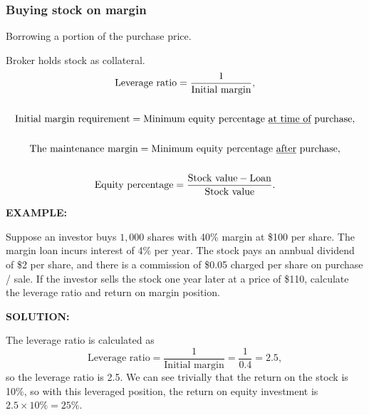 \documentclass[../notes_compiled.tex]{subfiles}
\begin{document}
\subsubsection{Buying stock on margin}
\begin{itemize}
\item Borrowing a portion of the purchase price.
\item Broker holds stock as collateral.
\begin{gather}
\text{Leverage ratio} = \frac{1}{\text{Initial margin}}, \\ \nonumber \\
\text{Initial margin requirement} = \text{Minimum equity percentage \underline{at time of} purchase}, \\ \nonumber \\
\text{The maintenance margin} = \text{Minimum equity percentage \underline{after} purchase}, \\ \nonumber \\
\text{Equity percentage} = \frac{\text{Stock value}-\text{Loan}}{\text{Stock value}}.
\end{gather}

{\color{RedViolet}
\item[] \textbf{EXAMPLE:} 
\item[] Suppose an investor buys $1,000$ shares with 40\% margin at \$100 per share. The margin loan incurs interest of 4\% per year. The stock pays an annbual dividend of \$2 per share, and there is a commission of \$0.05 charged per share on purchase / sale. If the investor sells the stock one year later at a price of \$110, calculate the leverage ratio and return on margin position.
}
{\color{RoyalBlue}
\item[] \textbf{SOLUTION:}
\item[] The leverage ratio is calculated as
\begin{equation*}
\text{Leverage ratio} = \frac{1}{\text{Initial margin}} = \frac{1}{0.4} = 2.5,
\end{equation*}
so the leverage ratio is 2.5. We can see trivially that the return on the stock is 10\%, so with this leveraged position, the return on equity investment is $2.5\times10\%=25\%$.

}
\end{itemize}
\end{document}
